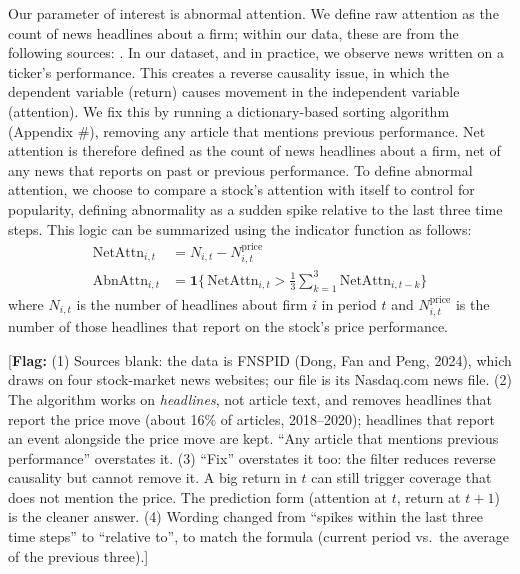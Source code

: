 \documentclass[11pt]{article}
\newcommand{\flag}[1]{{\color{red!75!black}\small [\textbf{Flag:} #1]}}
\begin{document}
Our parameter of interest is abnormal attention. We define raw attention as the count of news headlines about a firm; within our data, these are from the following sources: \underline{\hspace{3cm}}. In our dataset, and in practice, we observe news written on a ticker's performance. This creates a reverse causality issue, in which the dependent variable (return) causes movement in the independent variable (attention). We fix this by running a dictionary-based sorting algorithm (Appendix \#), removing any article that mentions previous performance. Net attention is therefore defined as the count of news headlines about a firm, net of any news that reports on past or previous performance. To define abnormal attention, we choose to compare a stock's attention with itself to control for popularity, defining abnormality as a sudden spike relative to the last three time steps. This logic can be summarized using the indicator function as follows:
\begin{align}
\text{NetAttn}_{i,t} &= N_{i,t} - N^{\text{price}}_{i,t} \\
\text{AbnAttn}_{i,t} &= \mathbf{1}\Big\{\, \text{NetAttn}_{i,t} > \frac{1}{3}\sum_{k=1}^{3}\text{NetAttn}_{i,t-k} \Big\}
\end{align}
where $N_{i,t}$ is the number of headlines about firm $i$ in period $t$ and $N^{\text{price}}_{i,t}$ is the number of those headlines that report on the stock's price performance.

\flag{(1) Sources blank: the data is FNSPID (Dong, Fan and Peng, 2024), which draws on four stock-market news websites; our file is its Nasdaq.com news file. (2) The algorithm works on \emph{headlines}, not article text, and removes headlines that report the price move (about 16\% of articles, 2018--2020); headlines that report an event alongside the price move are kept. ``Any article that mentions previous performance'' overstates it. (3) ``Fix'' overstates it too: the filter reduces reverse causality but cannot remove it. A big return in $t$ can still trigger coverage that does not mention the price. The prediction form (attention at $t$, return at $t+1$) is the cleaner answer. (4) Wording changed from ``spikes within the last three time steps'' to ``relative to'', to match the formula (current period vs.\ the average of the previous three).}
\end{document}
